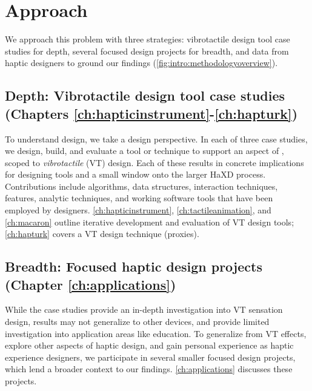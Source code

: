 \section{Approach}
We approach this problem with three strategies: vibrotactile design tool case studies for depth, several focused design projects for breadth, and data from haptic designers to ground our findings  (\autoref{fig:intro:methodologyoverview}).

\subsection{Depth: Vibrotactile design tool case studies (Chapters \ref{ch:hapticinstrument}-\ref{ch:hapturk})}
To understand design, we take a design perspective.
In each of three case studies, we design, build, and evaluate a tool or technique to support an aspect of \haxd, scoped to \emph{vibrotactile} (VT) design.
Each of these results in concrete implications for designing tools and a small window onto the larger HaXD process.
Contributions include algorithms, data structures, interaction techniques, features, analytic techniques, and working software tools that have been employed by designers.
\autoref{ch:hapticinstrument}, \autoref{ch:tactileanimation}, and \autoref{ch:macaron} outline iterative development and evaluation of VT design tools; \autoref{ch:hapturk} covers a VT design technique (proxies).

\subsection{Breadth: Focused haptic design projects (Chapter \ref{ch:applications})}
While the case studies provide an in-depth investigation into VT sensation design, results may not generalize to other devices, and provide limited investigation into application areas like education.
To generalize from VT effects, explore other aspects of haptic design, and gain personal experience as haptic experience designers, we participate in several smaller focused design projects, which lend a broader context to our findings.
\autoref{ch:applications} discusses these projects.

